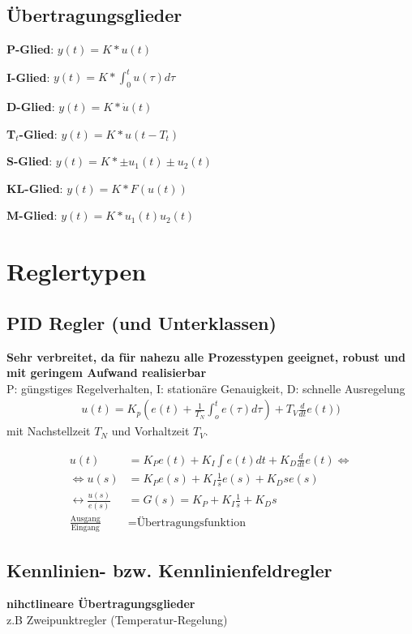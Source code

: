 \subsection{Übertragungsglieder}
\begin{compactitem}
    \item \textbf{P-Glied}: $y(t) = K * u(t)$
    \item \textbf{I-Glied}: $y(t) = K * \int_0^t u(\tau)d\tau$
    \item \textbf{D-Glied}: $y(t) = K * \dot{u}(t)$
    \item \textbf{T$_t$-Glied}: $y(t) = K * u(t-T_t)$
    \item \textbf{S-Glied}: $y(t) = K * \pm u_1(t) \pm u_2(t)$
    \item \textbf{KL-Glied}: $y(t) = K * F(u(t))$
    \item \textbf{M-Glied}: $y(t) = K * u_1(t)u_2(t)$
\end{compactitem}

\section{Reglertypen}
\subsection{PID Regler (und Unterklassen)}
\textbf{Sehr verbreitet, da für nahezu alle Prozesstypen geeignet, robust und mit geringem Aufwand
realisierbar} \\
P: güngstiges Regelverhalten, I: stationäre Genauigkeit, D: schnelle Ausregelung
\begin{align}
    u(t) = K_p (e(t) + \frac{1}{T_N}\int_o^t e(\tau)d\tau)+ T_V \frac{d}{dt}e(t))
\end{align}
mit Nachstellzeit $T_N$ und Vorhaltzeit $T_V$.

\begin{align}
    u(t) &= K_Pe(t) + K_I \int e(t)dt + K_D \frac{d}{dt}e(t) \Leftrightarrow \\
    \Leftrightarrow u(s) &= K_Pe(s) + K_I \frac{1}{s}e(s) + K_Dse(s) \\
    \leftrightarrow \frac{u(s)}{e(s)} &= G(s) = K_P + K_I \frac{1}{s}+K_Ds \\
    \frac{\text{Ausgang}}{\text{Eingang}} &= \text{Übertragungsfunktion}
\end{align}
\subsection{Kennlinien- bzw. Kennlinienfeldregler}
\textbf{nihctlineare Übertragungsglieder}\\
z.B Zweipunktregler (Temperatur-Regelung)
\newpage
